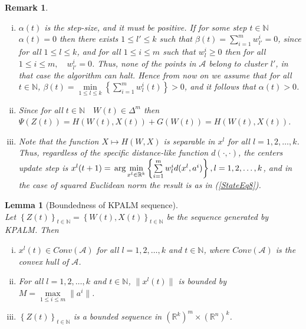 \documentclass[11pt]{article}
\numberwithin{equation}{section}
\newtheorem{lemma}{Lemma}[proposition]
\newtheorem{remark}{Remark}
\begin{document}
\begin{remark} 
	\begin{enumerate}[(i)] \label{StateEq15}
		\item $\alpha(t)$ is the step-size, and it must be positive. If for some step $t \in \mathbb{N}$ $\alpha(t)=0$ then there exists $1 \leq l' \leq k$ such that $\beta(t) = \sum\limits_{i=1}^{m} w^i_{l'} = 0$, since for all $1 \leq l \leq k$, and for all $1 \leq i \leq m$ such that $w^i_l \geq 0$ then for all $1 \leq i \leq m, \quad w^i_{l'}=0$. Thus, none of the points in $\mathcal{A}$ belong to cluster $l'$, in that case the algorithm can halt. Hence from now on we assume that for all $t \in \mathbb{N}$, $\beta(t) = \min\limits_{1 \leq l \leq k} \left\lbrace \sum\limits_{i=1}^{m} w^i_l(t)\right \rbrace > 0$, and it follows that $\alpha(t) > 0 $.
		\item Since for all $t \in \mathbb{N} \quad W(t) \in \Delta^m$ then $\Psi(Z(t)) = H(W(t),X(t)) + G(W(t)) = H(W(t),X(t))$. \label{StateEq16}
		\item Note that the function $X \mapsto H(W,X)$ is separable in $x^l$ for all $l = 1, 2, \ldots, k$. Thus, regardless of the specific distance-like function $d(\cdot, \cdot)$, the centers update step is $x^l(t+1) = \\ \arg\min\limits_{x^l \in \mathbb{R}^k} \left\lbrace \sum\limits_{i=1}^{m} w^i_l d(x^l , a^i) \right\rbrace, l = 1, 2, \ldots, k$, and in the case of squared Euclidean norm the result is as in (\ref{StateEq8}).
	\end{enumerate}
\end{remark}

\begin{lemma}[Boundedness of KPALM sequence] \ \\
Let $\left\lbrace Z(t) \right\rbrace_{t \in \mathbb{N}} = \left\lbrace W(t) , X(t) \right\rbrace_{t \in \mathbb{N}}$ be the sequence generated by KPALM. Then 
\begin{enumerate}[(i)]
	\item $x^l(t) \in Conv(\mathcal{A})$ for all $l=1, 2, \ldots ,k$ and $t \in \mathbb{N}$, where $Conv(\mathcal{A})$ is the convex hull of $\mathcal{A}$.
	\item For all $l=1, 2, \ldots ,k$ and $t \in \mathbb{N}$, $\| x^l(t) \|$ is bounded by $M = \max\limits_{1 \leq i \leq m} \| a^i \|$.
	\item $\left\lbrace Z(t) \right\rbrace_{t \in \mathbb{N}}$ is a bounded sequence in $(\mathbb{R}^k)^m \times (\mathbb{R}^n)^k$.
\end{enumerate}
\end{lemma}
\end{document}
